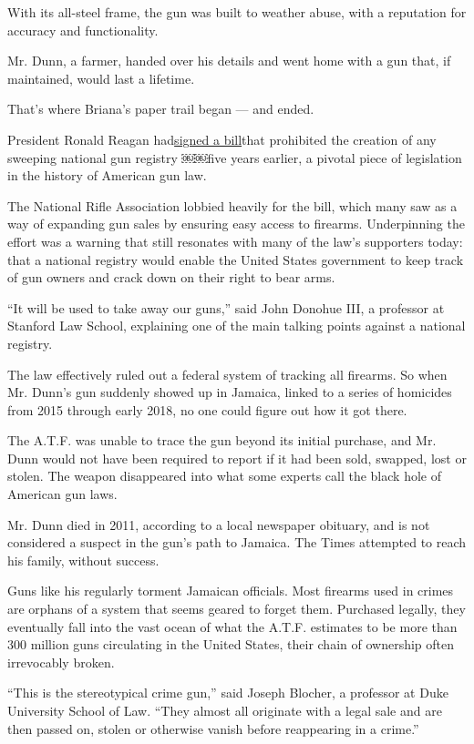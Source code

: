 With its all-steel frame, the gun was built to weather abuse, with a
reputation for accuracy and functionality.

Mr. Dunn, a farmer, handed over his details and went home with a gun
that, if maintained, would last a lifetime.

That's where Briana's paper trail began --- and ended.

President Ronald Reagan
had\href{https://www.congress.gov/bill/99th-congress/senate-bill/49}{signed
a bill}that prohibited the creation of any sweeping national gun
registry ￼￼five years earlier, a pivotal piece of legislation in the
history of American gun law.

The National Rifle Association lobbied heavily for the bill, which many
saw as a way of expanding gun sales by ensuring easy access to firearms.
Underpinning the effort was a warning that still resonates with many of
the law's supporters today: that a national registry would enable the
United States government to keep track of gun owners and crack down on
their right to bear arms.

``It will be used to take away our guns,'' said John Donohue III, a
professor at Stanford Law School, explaining one of the main talking
points against a national registry.

The law effectively ruled out a federal system of tracking all firearms.
So when Mr. Dunn's gun suddenly showed up in Jamaica, linked to a series
of homicides from 2015 through early 2018, no one could figure out how
it got there.

The A.T.F. was unable to trace the gun beyond its initial purchase, and
Mr. Dunn would not have been required to report if it had been sold,
swapped, lost or stolen. The weapon disappeared into what some experts
call the black hole of American gun laws.

Mr. Dunn died in 2011, according to a local newspaper obituary, and is
not considered a suspect in the gun's path to Jamaica. The Times
attempted to reach his family, without success.

Guns like his regularly torment Jamaican officials. Most firearms used
in crimes are orphans of a system that seems geared to forget them.
Purchased legally, they eventually fall into the vast ocean of what the
A.T.F. estimates to be more than 300 million guns circulating in the
United States, their chain of ownership often irrevocably broken.

``This is the stereotypical crime gun,'' said Joseph Blocher, a
professor at Duke University School of Law. ``They almost all originate
with a legal sale and are then passed on, stolen or otherwise vanish
before reappearing in a crime.''


